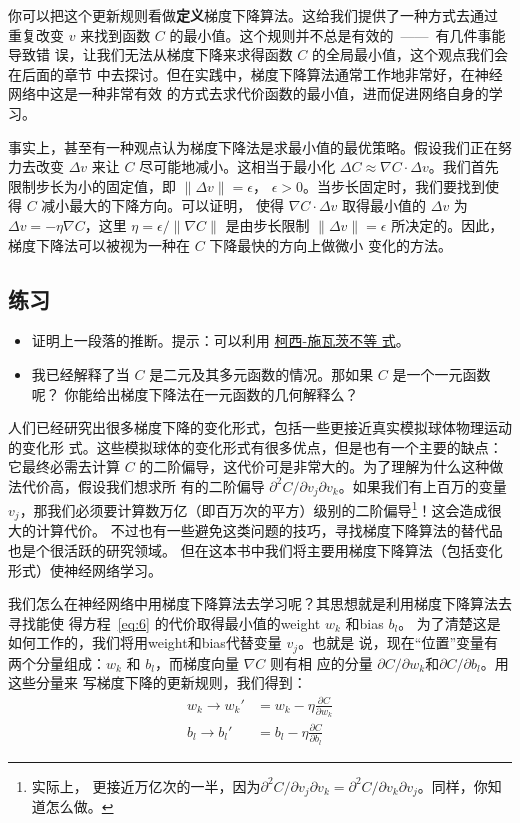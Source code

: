 你可以把这个更新规则看做\textbf{定义}梯度下降算法。这给我们提供了一种方式去通过
重复改变 $v$ 来找到函数 $C$ 的最小值。这个规则并不总是有效的~——~有几件事能导致错
误，让我们无法从梯度下降来求得函数 $C$ 的全局最小值，这个观点我们会在后面的章节
中去探讨。但在实践中，梯度下降算法通常工作地非常好，在神经网络中这是一种非常有效
的方式去求代价函数的最小值，进而促进网络自身的学习。

事实上，甚至有一种观点认为梯度下降法是求最小值的最优策略。假设我们正在努力去改变
$\Delta v$ 来让 $C$ 尽可能地减小。这相当于最小化 $\Delta C \approx \nabla C
\cdot \Delta v$。我们首先限制步长为小的固定值，即 $\| \Delta v \| = \epsilon$，
$\epsilon > 0$。当步长固定时，我们要找到使得 $C$ 减小最大的下降方向。可以证明，
使得 $\nabla C \cdot \Delta v$ 取得最小值的 $\Delta v$ 为 $\Delta v = - \eta
\nabla C$，这里 $\eta = \epsilon / \|\nabla C\|$ 是由步长限制 $\|\Delta v\| =
\epsilon$ 所决定的。因此，梯度下降法可以被视为一种在 $C$ 下降最快的方向上做微小
变化的方法。

\subsection*{练习}

\begin{itemize}
\item 证明上一段落的推断。提示：可以利用%
  \href{http://en.wikipedia.org/wiki/Cauchy–Schwarz_inequality}{柯西-施瓦茨不等
    式}。
\item 我已经解释了当 $C$ 是二元及其多元函数的情况。那如果 $C$ 是一个一元函数呢？
  你能给出梯度下降法在一元函数的几何解释么？
\end{itemize}

人们已经研究出很多梯度下降的变化形式，包括一些更接近真实模拟球体物理运动的变化形
式。这些模拟球体的变化形式有很多优点，但是也有一个主要的缺点：它最终必需去计算
$C$ 的二阶偏导，这代价可是非常大的。为了理解为什么这种做法代价高，假设我们想求所
有的二阶偏导 $\partial^2 C/ \partial v_j \partial v_k$。如果我们有上百万的变量
$v_j$，那我们必须要计算数万亿（即百万次的平方）级别的二阶偏导\footnote{实际上，
  更接近万亿次的一半，因为$\partial^2 C/ \partial v_j \partial v_k = \partial^2
  C/ \partial v_k \partial v_j$。同样，你知道怎么做。}！这会造成很大的计算代价。
不过也有一些避免这类问题的技巧，寻找梯度下降算法的替代品也是个很活跃的研究领域。
但在这本书中我们将主要用梯度下降算法（包括变化形式）使神经网络学习。

我们怎么在神经网络中用梯度下降算法去学习呢？其思想就是利用梯度下降算法去寻找能使
得方程~\eqref{eq:6} 的代价取得最小值的\gls*{weight} $w_k$ 和\gls*{bias} $b_l$。
为了清楚这是如何工作的，我们将用\gls*{weight}和\gls*{bias}代替变量 $v_j$。也就是
说，现在“位置”变量有两个分量组成：$w_k$ 和 $b_l$，而梯度向量 $\nabla C$ 则有相
应的分量 $\partial C / \partial w_k$和$\partial C / \partial b_l$。用这些分量来
写梯度下降的更新规则，我们得到：
\begin{align}
  \label{eq:16}w_k \rightarrow w_k' &= w_k-\eta \frac{\partial C}{\partial w_k}\tag{16}\\
  \label{eq:17}b_l \rightarrow b_l' &= b_l-\eta \frac{\partial C}{\partial b_l}\tag{17}
\end{align}

